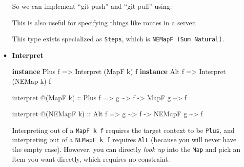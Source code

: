 \documentclass[]{article}
\newenvironment{Shaded}{}{}
\newcommand{\DataTypeTok}[1]{\textcolor[rgb]{0.56,0.13,0.00}{#1}}
\newcommand{\KeywordTok}[1]{\textcolor[rgb]{0.00,0.44,0.13}{\textbf{#1}}}
\newcommand{\NormalTok}[1]{#1}
\newcommand{\OperatorTok}[1]{\textcolor[rgb]{0.40,0.40,0.40}{#1}}
\newcommand{\OtherTok}[1]{\textcolor[rgb]{0.00,0.44,0.13}{#1}}
\newcommand{\StringTok}[1]{\textcolor[rgb]{0.25,0.44,0.63}{#1}}
\begin{document}
\begin{itemize}
  So we can implement ``git push'' and ``git pull'' using:

\begin{Shaded}
\end{Shaded}

  This is also useful for specifying things like routes in a server.

  This type exists specialized as \texttt{Steps}, which is
  \texttt{NEMapF\ (Sum\ Natural)}.
\item
  \textbf{Interpret}

\begin{Shaded}
\begin{Highlighting}[]
\KeywordTok{instance} \DataTypeTok{Plus}\NormalTok{ f }\OtherTok{=>} \DataTypeTok{Interpret}\NormalTok{ (}\DataTypeTok{MapF}\NormalTok{  k) f}
\KeywordTok{instance} \DataTypeTok{Alt}\NormalTok{  f }\OtherTok{=>} \DataTypeTok{Interpret}\NormalTok{ (}\DataTypeTok{NEMap}\NormalTok{ k) f}

\NormalTok{interpret }\OperatorTok{@}\NormalTok{(}\DataTypeTok{MapF}\NormalTok{ k)}
\OtherTok{    ::} \DataTypeTok{Plus}\NormalTok{ f}
    \OtherTok{=>}\NormalTok{ g }\OperatorTok{\textasciitilde{}>}\NormalTok{ f}
    \OtherTok{{-}>} \DataTypeTok{MapF}\NormalTok{ g }\OperatorTok{\textasciitilde{}>}\NormalTok{ f}

\NormalTok{interpret }\OperatorTok{@}\NormalTok{(}\DataTypeTok{NEMapF}\NormalTok{ k)}
\OtherTok{    ::} \DataTypeTok{Alt}\NormalTok{ f}
    \OtherTok{=>}\NormalTok{ g }\OperatorTok{\textasciitilde{}>}\NormalTok{ f}
    \OtherTok{{-}>} \DataTypeTok{NEMapF}\NormalTok{ g }\OperatorTok{\textasciitilde{}>}\NormalTok{ f}
\end{Highlighting}
\end{Shaded}

  Interpreting out of a \texttt{MapF\ k\ f} requires the target context to be
  \texttt{Plus}, and interpreting out of a \texttt{NEMapF\ k\ f} requires
  \texttt{Alt} (because you will never have the empty case). However, you can
  directly \emph{look up} into the \texttt{Map} and pick an item you want
  directly, which requires no constraint.
\end{itemize}
\end{document}
